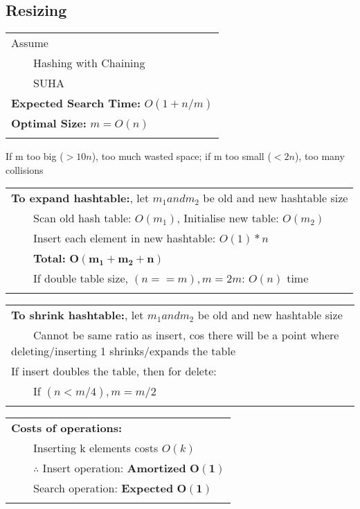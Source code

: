 \documentclass{article}
\newcommand{\tabitem}{~~\llap{\textbullet}~~}
\begin{document}
    \subsection{Resizing}

    \noindent\begin{tabular}{l}
        Assume\\
        \tabitem Hashing with Chaining\\
        \tabitem SUHA\\
        \textbf{Expected Search Time:} $O(1 + n/m)$\\
        \textbf{Optimal Size:} $m = O(n)$\\\\
    \end{tabular}

    If m too big ($> 10n$), too much wasted space; if m too small ($< 2n$), too many collisions\\
    
    \noindent\begin{tabular}{l}
        \textbf{To expand hashtable:}, let $m_{1} and m_{2}$ be old and new hashtable size\\
        \tabitem Scan old hash table: $O(m_{1})$, Initialise new table: $O(m_{2})$\\
        \tabitem Insert each element in new hashtable: $O(1) * n$\\
        \tabitem \textbf{Total: } $\bm{O(m_{1} + m_{2} + n)}$\\
        \tabitem If double table size, $(n == m), m = 2m$: $O(n)$ time\\\\
    \end{tabular}

    \noindent\begin{tabular}{l}
        \textbf{To shrink hashtable:}, let $m_{1} and m_{2}$ be old and new hashtable size\\
        \tabitem Cannot be same ratio as insert, cos there will be a point where deleting/inserting 1 shrinks/expands the table\\
        If insert doubles the table, then for delete:\\
        \tabitem If $(n < m/4), m = m/2$\\\\
    \end{tabular}

    \noindent\begin{tabular}{l}
        \textbf{Costs of operations:}\\
        \tabitem Inserting k elements costs $O(k)$\\
        \tabitem $\therefore$ Insert operation: \textbf{Amortized }$\bm{O(1)}$\\
        \tabitem Search operation: \textbf{Expected }$\bm{O(1)}$\\\\
    \end{tabular}
\end{document}
